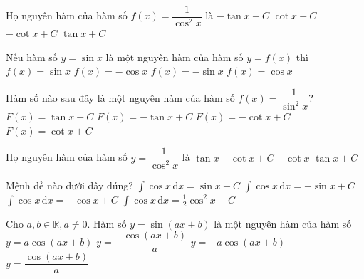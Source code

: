 \begin{ex}%
	Họ nguyên hàm của hàm  số $f(x)=\dfrac{1}{\cos ^2x}$ là
	\choice 
		 {$-\tan x+C$}
		{$\cot  x+C$}
		{$-\cot x+C$} 
		{\True  $\tan x+C$}
\end{ex}

\begin{ex}%
	Nếu hàm số $ y=\sin  x$ là một nguyên hàm của hàm số $ y=f(x)$ thì
	\choice 
		{$ f(x)=\sin x$} 
		{$  f(x)=-\cos x$}
		{$  f(x)=-\sin x$}
		{\True $  f(x)=\cos x$}
\end{ex}

\begin{ex}%
	Hàm số nào sau đây là  một nguyên hàm của hàm số $f(x)=\dfrac{1}{\sin^2x}$?
	\choice 
		{$F(x)=\tan  x +C$}
		{$F(x)=-\tan x  +C$}
		{\True $F(x)=-\cot x  +C$}
		{$F(x)=\cot x +C$} 
\end{ex}

\begin{ex}%
	Họ nguyên hàm của hàm số $y=\dfrac{1}{\cos ^2x}$ là 
	 \choice
		 {$\tan x$}
		{$-\cot x+C$} 
		{$-\cot x$} 
		{\True  $\tan x+C$}
\end{ex}

\begin{ex}%
	Mệnh đề nào dưới  đây đúng?
	\choice 
		{\True $\displaystyle\int  \cos x\,\mathrm{d}x=\sin x+C$}
		 {$\displaystyle\int \cos x\,\mathrm{d}x=-\sin x+C$}
		{$\displaystyle\int  \cos x\,\mathrm{d}x=-\cos x+C$}
		 {$\displaystyle\int \cos x\,\mathrm{d}x=\frac{1}{2}\cos^2 x+C$}
\end{ex}

\begin{ex}%
	Cho $a, b \in \mathbb{R}, a \neq 0$. Hàm số $y = \sin(ax+b)$  là một nguyên hàm của hàm số
	 \choice
		{\True $y  = a \cos(ax+b)$}
		{$y = -\dfrac{\cos(ax+b)}{a}$} 
		{$y =  -a \cos(ax+b)$}
		{$y  = \dfrac{\cos(ax+b)}{a}$}
\end{ex}

